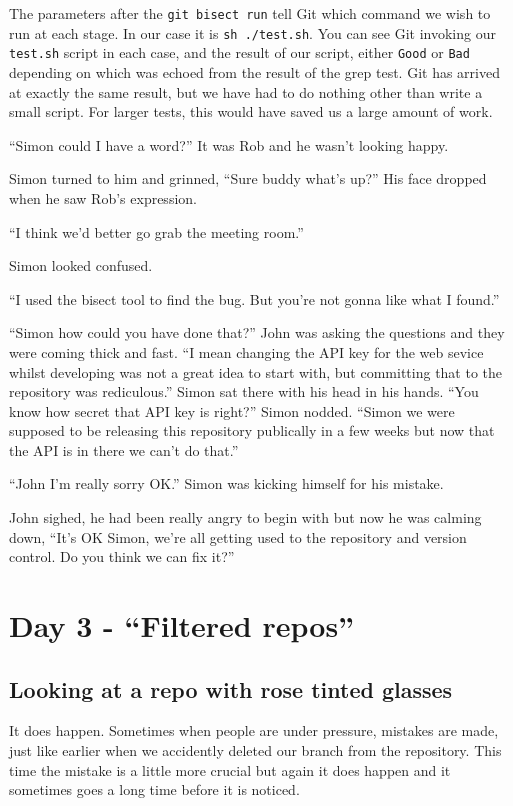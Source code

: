 The parameters after the \texttt{git bisect run} tell Git which command we wish to run at each stage.
In our case it is \texttt{sh ./test.sh}.
You can see Git invoking our \texttt{test.sh} script in each case, and the result of our script, either \texttt{Good} or \texttt{Bad} depending on which was echoed from the result of the grep test.
Git has arrived at exactly the same result, but we have had to do nothing other than write a small script.
For larger tests, this would have saved us a large amount of work.

\begin{trenches}
``Simon could I have a word?'' It was Rob and he wasn't looking happy.

Simon turned to him and grinned, ``Sure buddy what's up?''  His face dropped when he saw Rob's expression.

``I think we'd better go grab the meeting room.''

Simon looked confused.

``I used the bisect tool to find the bug.  But you're not gonna like what I found.''

\thoughtbreak

``Simon how could you have done that?'' John was asking the questions and they were coming thick and fast.
``I mean changing the API key for the web sevice whilst developing was not a great idea to start with, but committing that to the repository was rediculous.''
Simon sat there with his head in his hands.
``You know how secret that API key is right?'' Simon nodded.
``Simon we were supposed to be releasing this repository publically in a few weeks but now that the API is in there we can't do that.''

``John I'm really sorry OK.'' Simon was kicking himself for his mistake.

John sighed, he had been really angry to begin with but now he was calming down,
``It's OK Simon, we're all getting used to the repository and version control.  Do you think we can fix it?''
\end{trenches}

\section{Day 3 - ``Filtered repos''}
\subsection{Looking at a repo with rose tinted glasses}
It does happen. Sometimes when people are under pressure, mistakes are made, just like earlier when we accidently deleted our branch from the repository.
This time the mistake is a little more crucial but again it does happen and it sometimes goes a long time before it is noticed.

